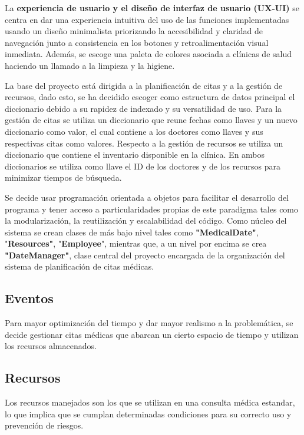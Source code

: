 \documentclass[12pt]{article}
\begin{document}
	La \textbf{experiencia de usuario y el diseño de interfaz de usuario (UX-UI)} se centra en dar una experiencia intuitiva del uso de las funciones implementadas  usando un diseño minimalista priorizando la accesibilidad y claridad de navegación junto a consistencia en los botones y retroalimentación visual inmediata. Además, se escoge una paleta de colores asociada a clínicas de salud haciendo un llamado a la limpieza y la higiene.
	
	La base del proyecto está dirigida a la planificación de citas y a la gestión de recursos, dado esto, se ha decidido escoger como estructura de datos principal el diccionario debido a su rapidez de indexado y su versatilidad de uso. Para la gestión de citas se utiliza un diccionario que reune fechas como llaves y un nuevo diccionario como valor, el cual contiene a los doctores como llaves y sus respectivas citas como valores. Respecto a la gestión de recursos se utiliza un diccionario que contiene el inventario disponible en la clínica. En ambos diccionarios se utiliza como llave el ID de los doctores y de los recursos para minimizar tiempos de búsqueda.
	
	Se decide usar programación orientada a objetos para facilitar el desarrollo del programa y tener acceso a particularidades propias de este paradigma tales como la modularización, la reutilización y escalabilidad del código. Como núcleo del sistema se crean clases de más bajo nivel tales como \textbf{"MedicalDate"}, "\textbf{Resources"}, "\textbf{Employee}", mientras que, a un nivel por encima se crea \textbf{"DateManager"}, clase central del proyecto encargada de la organización del sistema de planificación de citas médicas.
	
	\subsection{Eventos}
	
	Para mayor optimización del tiempo y dar mayor realismo a la problemática, se decide gestionar citas médicas que abarcan un cierto espacio de tiempo y utilizan los recursos almacenados.
	
	\subsection{Recursos}
	
	Los recursos manejados son los que se utilizan en una consulta médica estandar, lo que implica que se cumplan determinadas condiciones para su correcto uso y prevención de riesgos. 
	
\end{document}
